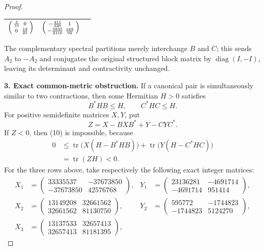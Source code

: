 \documentclass[11pt]{article}
\begin{document}
\begin{proof}
\begin{center}
\begin{tabular}{c c c}
$\begin{psmallmatrix}\frac3{10}&0\\0&\frac{19}{25}\end{psmallmatrix}$ &
$\begin{psmallmatrix}-\frac{411}{230}&1\\-\frac{5835}{2116}&\frac{169}{92}\end{psmallmatrix}$\\
\bottomrule
\end{tabular}
\end{center}
The complementary spectral partitions merely interchange $B$ and $C$; this sends $A_2$ to $-A_2$ and conjugates the original structured block matrix by $\operatorname{diag}(I,-I)$, leaving its determinant and contractivity unchanged.

\medskip
\noindent\textbf{3. Exact common-metric obstruction.}
If a canonical pair is simultaneously similar to two contractions, then some Hermitian $H>0$ satisfies
\[
B^*HB\le H,\qquad C^*HC\le H. \tag{10}
\]
For positive semidefinite matrices $X,Y$, put
\[
Z=X-BXB^*+Y-CYC^*.
\]
If $Z<0$, then (10) is impossible, because
\begin{align*}
0&\le \operatorname{tr}\!\bigl(X(H-B^*HB)\bigr)
 +\operatorname{tr}\!\bigl(Y(H-C^*HC)\bigr)\\
&=\operatorname{tr}(ZH)<0. \tag{11}
\end{align*}
For the three rows above, take respectively the following exact integer matrices:
\begin{align*}
X_1&=\begin{pmatrix}33335537&-37673850\\-37673850&42576768\end{pmatrix},&
Y_1&=\begin{pmatrix}23136281&-4691714\\-4691714&951414\end{pmatrix},\\
X_2&=\begin{pmatrix}13149208&32661562\\32661562&81130750\end{pmatrix},&
Y_2&=\begin{pmatrix}595772&-1744823\\-1744823&5124270\end{pmatrix},\\
X_3&=\begin{pmatrix}13137533&32657413\\32657413&81181395\end{pmatrix},&

\end{align*}
\end{proof}
\end{document}
